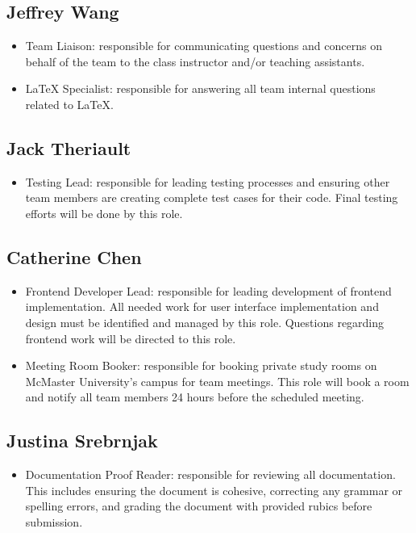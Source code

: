 \documentclass{article}
\begin{document}
\subsection{Jeffrey Wang}

\begin{itemize}
	\item Team Liaison: responsible for communicating questions and concerns on behalf of the team to the class instructor and/or teaching assistants. 
	\item LaTeX Specialist: responsible for answering all team internal questions related to LaTeX. 
\end{itemize}

\subsection{Jack Theriault}

\begin{itemize}
	\item Testing Lead: responsible for leading testing processes and ensuring other team members are creating complete test cases for their code. Final testing efforts will be done by this role.
\end{itemize}

\subsection{Catherine Chen}

\begin{itemize}
	\item Frontend Developer Lead: responsible for leading development of frontend implementation. All needed work for user interface implementation and design must be identified and managed by this role. Questions regarding frontend work will be directed to this role.
	\item Meeting Room Booker: responsible for booking private study rooms on McMaster University's campus for team meetings. This role will book a room and notify all team members 24 hours before the scheduled meeting.
\end{itemize}

\subsection{Justina Srebrnjak}

\begin{itemize}
	\item Documentation Proof Reader: responsible for reviewing all documentation. This includes ensuring the document is cohesive, correcting any grammar or spelling errors, and grading the document with provided rubics before submission.   
\end{itemize}
\end{document}
